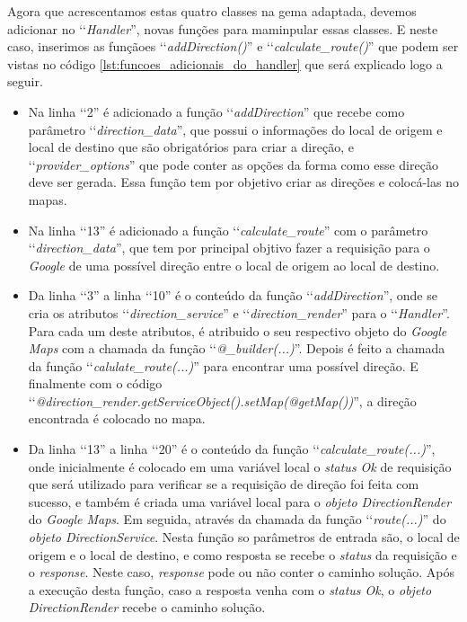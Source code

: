 Agora que acrescentamos estas quatro classes na gema adaptada, devemos adicionar no ‘‘\emph{Handler}'', 
novas funções para maminpular essas classes. E neste caso, inserimos as funçãoes ‘‘\emph{addDirection()}'' e 
‘‘\emph{calculate\_route()}'' que podem ser vistas no código \ref{lst:funcoes_adicionais_do_handler} que
será explicado logo a seguir.

\begin{itemize}

 \item Na linha ‘‘2'' é adicionado a função ‘‘\emph{addDirection}'' que recebe como parâmetro 
 ‘‘\emph{direction\_data}'', que possui o informações do local de origem e local de destino que são 
 obrigatórios para criar a direção, e ‘‘\emph{provider\_options}'' que pode conter as opções da forma
 como esse direção deve ser gerada. Essa função tem por objetivo criar as direções e colocá-las no mapas.
 
 \item Na linha ‘‘13'' é adicionado a função ‘‘\emph{calculate\_route}'' com o parâmetro 
 ‘‘\emph{direction\_data}'', que tem por principal objtivo fazer a requisição para o \emph{Google } de uma 
 possível direção entre o local de origem ao local de destino.
 
 \item Da linha ‘‘3'' a linha ‘‘10'' é o conteúdo da função ‘‘\emph{addDirection}'', onde se cria os
 atributos ‘‘\emph{direction\_service}'' e ‘‘\emph{direction\_render}'' para o ‘‘\emph{Handler}''. Para
 cada um deste atributos, é atribuido o seu respectivo objeto do \emph{Google Maps} com a chamada da função 
 ‘‘\emph{@\_builder(...)}''. Depois é feito a chamada da função ‘‘\emph{calulate\_route(...)}''
 para encontrar uma possível direção. E finalmente com o código 
 ‘‘\emph{@direction\_render.getServiceObject().setMap(@getMap())}'', a direção encontrada é colocado 
 no mapa.
 
 \item Da linha ‘‘13'' a linha ‘‘20'' é o conteúdo da função ‘‘\emph{calculate\_route(...)}'', onde 
 inicialmente é colocado em uma variável local o \emph{status Ok} de requisição que será utilizado
 para verificar se a requisição de direção foi feita com sucesso, e também é criada uma variável local 
 para o \emph{objeto DirectionRender} do \emph{Google Maps}. Em seguida, através da chamada da função 
 ‘‘\emph{route(...)}'' do \emph{objeto DirectionService}. Nesta função so parâmetros de entrada são,
 o local de origem e o local de destino, e como resposta se recebe o \emph{status} da requisição
 e o \emph{response}. Neste caso, \emph{response} pode ou não conter o caminho solução. Após a execução
 desta função, caso a resposta venha com o \emph{status Ok}, o \emph{objeto DirectionRender} recebe o
 caminho solução.
 
\end{itemize}

